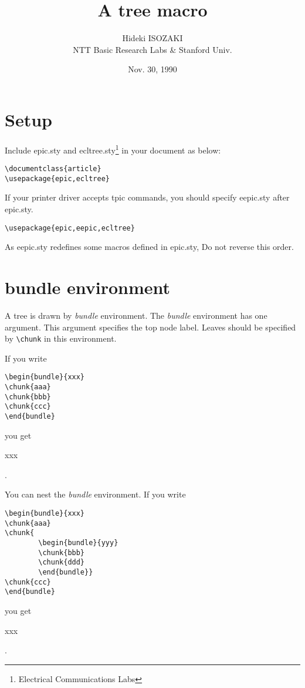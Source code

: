 \documentclass{article}
\title{A tree macro}
\author{Hideki ISOZAKI\\NTT Basic Research Labs \& Stanford Univ.}
\date{Nov. 30, 1990}
\begin{document}
\maketitle


\section{Setup}

Include epic.sty and ecltree.sty\footnote{Electrical Communications Labs}
in your document as below:
\begin{verbatim}
\documentclass{article}
\usepackage{epic,ecltree}
\end{verbatim}
If your printer driver accepts tpic commands,
you should specify eepic.sty after epic.sty.
\begin{verbatim}
\usepackage{epic,eepic,ecltree}
\end{verbatim}
As eepic.sty redefines some macros defined in epic.sty,
Do not reverse this order.

\section{bundle environment}

A tree is drawn by {\it bundle} environment.
The {\it bundle} environment has one argument.
This argument specifies the top node label.
Leaves should be specified by \verb|\chunk| in this environment.

If you write
\begin{verbatim}
\begin{bundle}{xxx}
\chunk{aaa}
\chunk{bbb}
\chunk{ccc}
\end{bundle}
\end{verbatim}
you get
\begin{bundle}{xxx}
\end{bundle}.

You can nest the {\it bundle} environment.
If you write
\begin{verbatim}
\begin{bundle}{xxx}
\chunk{aaa}
\chunk{
        \begin{bundle}{yyy}
        \chunk{bbb}
        \chunk{ddd}
        \end{bundle}}
\chunk{ccc}
\end{bundle}
\end{verbatim}
you get
\begin{bundle}{xxx}
\end{bundle}.
\end{document}
